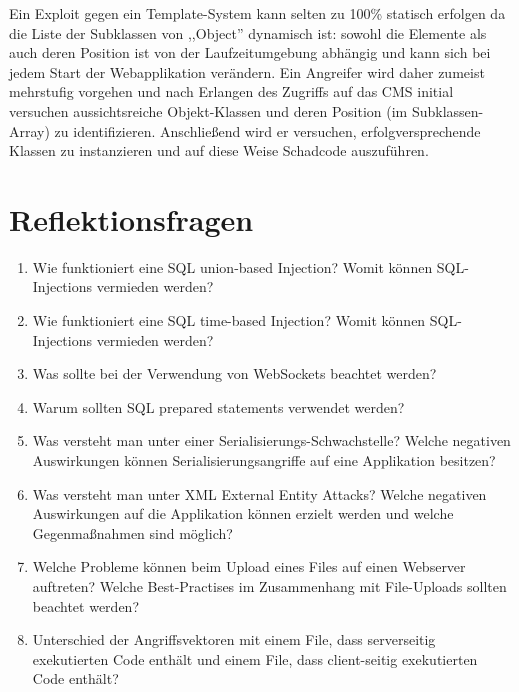 Ein Exploit gegen ein Template-System kann selten zu 100\% statisch erfolgen da die Liste der Subklassen von ,,Object'' dynamisch ist: sowohl die Elemente als auch deren Position ist von der Laufzeitumgebung abhängig und kann sich bei jedem Start der Webapplikation verändern. Ein Angreifer wird daher zumeist mehrstufig vorgehen und nach Erlangen des Zugriffs auf das CMS initial versuchen aussichtsreiche Objekt-Klassen und deren Position (im Subklassen-Array) zu identifizieren. Anschließend wird er versuchen, erfolgversprechende Klassen zu instanzieren und auf diese Weise Schadcode auszuführen.

\section{Reflektionsfragen}

\begin{enumerate}
	\item Wie funktioniert eine SQL union-based Injection? Womit können SQL-Injections vermieden werden?
	\item Wie funktioniert eine SQL time-based Injection? Womit können SQL-Injections vermieden werden?
	\item Was sollte bei der Verwendung von WebSockets beachtet werden?
	\item Warum sollten SQL prepared statements verwendet werden?
	\item Was versteht man unter einer Serialisierungs-Schwachstelle? Welche negativen Auswirkungen können Serialisierungsangriffe auf eine Applikation besitzen?
	\item Was versteht man unter XML External Entity Attacks? Welche negativen Auswirkungen auf die Applikation können erzielt werden und welche Gegenmaßnahmen sind möglich?
	\item Welche Probleme können beim Upload eines Files auf einen Webserver auftreten? Welche Best-Practises im Zusammenhang mit File-Uploads sollten beachtet werden?
	\item Unterschied der Angriffsvektoren mit einem File, dass serverseitig exekutierten Code enthält und einem File, dass client-seitig exekutierten Code enthält?
\end{enumerate}
